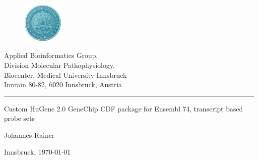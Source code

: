 \documentclass[a4paper,10pt,american]{report}
\begin{document}
\begin{titlepage}

 \begin{center}
   \parbox[t]{9cm}{
     \begin{figure}
        \includegraphics[width=2cm]{./images/MUIlogo-2.png}
      \end{figure}
      \parbox[t]{7.8cm}{
      \vspace{0.4cm}
      \raggedright
      \normalsize
      Applied Bioinformatics Group,\\
      Division Molecular Pathophysiology,\\
      Biocenter, Medical University Innsbruck\\
      Innrain 80-82, 6020 Innsbruck, Austria\\
      \noindent\rule[1ex]{\linewidth}{1pt}
      }
    }
  \end{center}
\vspace{6.5cm}
    \begin{center}
     \Large
     Custom HuGene 2.0 GeneChip CDF package for Ensembl 74, transcript based
     probe sets
    \end{center}

\vspace{1.5cm}

    \begin{center}
     \large
     Johannes Rainer
    \end{center}

\vspace{7.5cm}
   \vfill
   \begin{center}
     \normalsize
     Innsbruck, \today \\
   \end{center}
\end{titlepage}



\pagebreak

  \pagebreak

  \setcounter{secnumdepth}{0}

  \setcounter{secnumdepth}{3}

  \setcounter{page}{1}


\end{document}

